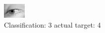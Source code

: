\begin{figure}[h!]
\begin{center}
\includegraphics[width=0.60\columnwidth]{figures/ID2974_class_3_target_4.png}
\end{center}
\caption{ Classification: 3 actual target: 4}
\label{fig:ID2974_class_3_target_4}
\end{figure}
